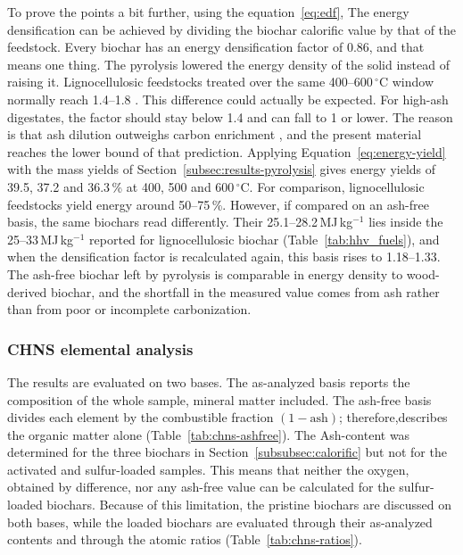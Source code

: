 To prove the points a bit further, using the equation~\ref{eq:edf}, The energy densification can be achieved by dividing the biochar calorific value by that of the feedstock. Every biochar has an energy densification factor of 0.86, and that means one thing. The pyrolysis lowered the energy density of the solid instead of raising it. Lignocellulosic feedstocks treated over the same 400--600\,$^{\circ}$C window normally reach 1.4--1.8 \parencite{bridgwater-2011, antal-2003}. This difference could actually be expected. For high-ash digestates, the factor should stay below 1.4 and can fall to 1 or lower. The reason is that ash dilution outweighs carbon enrichment \parencite{hung-2017, opatokun-2015}, and the present material reaches the lower bound of that prediction. Applying Equation~\ref{eq:energy-yield} with the mass
yields of Section~\ref{subsec:results-pyrolysis} gives energy yields of 39.5,
37.2 and 36.3\,\% at 400, 500 and 600\,$^{\circ}$C. For comparison, lignocellulosic feedstocks yield energy around 50--75\,\%.
However, if compared on an ash-free basis, the same biochars read differently. Their 25.1--28.2\,MJ\,kg$^{-1}$ lies inside the 25--33\,MJ\,kg$^{-1}$ reported for lignocellulosic
biochar (Table~\ref{tab:hhv_fuels}), and when the densification factor is recalculated again, this basis rises to 1.18--1.33. The ash-free biochar left by pyrolysis is comparable in energy density to wood-derived biochar, and the shortfall in the measured value comes from ash rather than from poor or incomplete carbonization. 
\newpage
\subsubsection{CHNS elemental analysis}
\label{subsubsec:chns}

The results are evaluated on two bases. The as-analyzed basis reports the composition of the whole sample, mineral matter included. The ash-free basis divides each element by the combustible fraction $(1-\text{ash})$; therefore,describes the organic matter alone (Table~\ref{tab:chns-ashfree}). The Ash-content was determined for the three biochars in Section~\ref{subsubsec:calorific} but not for the activated and sulfur-loaded samples. This means that neither the oxygen, obtained by difference, nor any ash-free value can be calculated for the sulfur-loaded biochars. Because of this limitation, the pristine biochars are discussed on both bases, while the loaded biochars are evaluated through their as-analyzed contents and through the atomic ratios (Table~\ref{tab:chns-ratios}).


